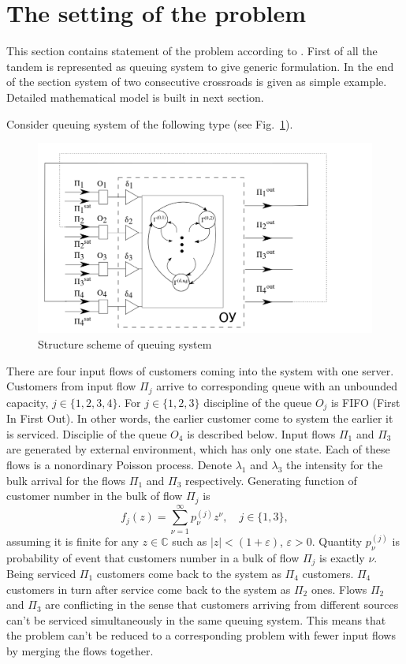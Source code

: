 \documentclass[10pt]{article}
\begin{document}
\section{The setting of the problem}

This section contains statement of the problem according to \cite{k:z:02:2015}. First of all the tandem is represented as queuing system to give generic formulation. In the end of the section system of two consecutive crossroads is given as simple example. Detailed mathematical model is built in next section.

Consider queuing system of the following type (see Fig.~\ref{SystemScheme}). 
\begin{figure}[h!]
   \centering
    \includegraphics[width=\textwidth]{SystemScheme.png} %
    \caption {Structure scheme of queuing system}
    \label{SystemScheme}
\end{figure}
There are four input flows of customers coming into the system with one server. Customers from input flow $\Pi_j$ arrive to corresponding queue with an unbounded capacity, $j \in \{1,2,3,4\}$. For $j \in \{1,2,3\}$ discipline of the queue $O_j$ is FIFO (First In First Out). In other words, the earlier customer come to system the earlier it is serviced. Disciplie of the queue $O_4$ is described below. Input flows $\Pi_1$ and $\Pi_3$ are generated by external environment, which has only one state. Each of these flows is a nonordinary Poisson process. Denote $\lambda_1$ and $\lambda_3$ the intensity for the bulk arrival for the flows $\Pi_1$ and $\Pi_3$ respectively. Generating function of customer number in the bulk of flow $\Pi_j$ is
\begin{equation}
f_j(z) = \sum_{\nu=1}^{\infty} p_{\nu}^{(j)} z ^{\nu}, \quad j\in \{1,3\},
\label{GeneratingFunc}
\end{equation}
assuming it is finite for any $z\in \mathbb{C}$ such as $|z|<(1+\varepsilon)$, $\varepsilon>0$. Quantity $p_{\nu}^{(j)}$ is probability of event that customers number in a bulk of flow $\Pi_j$ is exactly $\nu$. Being serviced $\Pi_1$ customers come back to the system as $\Pi_4$ customers. $\Pi_4$ customers in turn after service come back to the system as $\Pi_2$ ones. Flows $\Pi_2$ and $\Pi_3$ are conflicting in the sense that customers arriving from different sources can't be serviced simultaneously in the same queuing system. This means that the problem can't be reduced to a corresponding problem with fewer input flows by merging the flows together.
\end{document}
